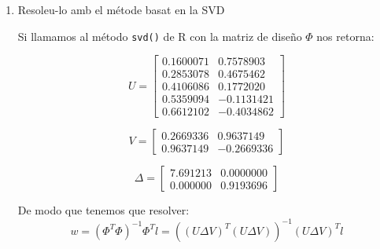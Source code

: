 \documentclass[a4paper]{article}
\begin{document}
\begin{enumerate}
{\begin{multicols}{2}
  \begin{equation*}
    (\Phi^T\Phi)^{-1} \Phi^T l =
    \begin{bmatrix}
      4.236 \\
      3.226
    \end{bmatrix}
  \end{equation*}


\end{multicols}

De modo que $e = w_0 = 4.236$ y $k = w_1 = 3.226$

}


  \item Resoleu-lo amb el métode basat en la SVD

  {\bfseries

  Si llamamos al método \texttt{svd()} de R con la matriz de diseño $\Phi$ nos
  retorna:

  \begin{multicols}{2}
    \begin{equation*}
      U =
      \begin{bmatrix}
        0.1600071 & 0.7578903 \\
         0.2853078 & 0.4675462 \\
        0.4106086 & 0.1772020 \\
         0.5359094 & -0.1131421 \\
        0.6612102 & -0.4034862
      \end{bmatrix}
    \end{equation*}





    \begin{equation*}
      V =
      \begin{bmatrix}
        0.2669336 & 0.9637149 \\
        0.9637149 & -0.2669336
      \end{bmatrix}
    \end{equation*}


    \begin{equation*}
      \Delta =
      \begin{bmatrix}
        7.691213 & 0.0000000 \\
        0.000000 & 0.9193696
      \end{bmatrix}
    \end{equation*}

  \end{multicols}

  De modo que tenemos que resolver:
  \begin{equation*}
    w = (\Phi^T\Phi)^{-1}\Phi^T l = ((U\Delta V)^T(U\Delta V))^{-1}(U\Delta V)^T l
  \end{equation*}

}
\end{enumerate}
\end{document}
